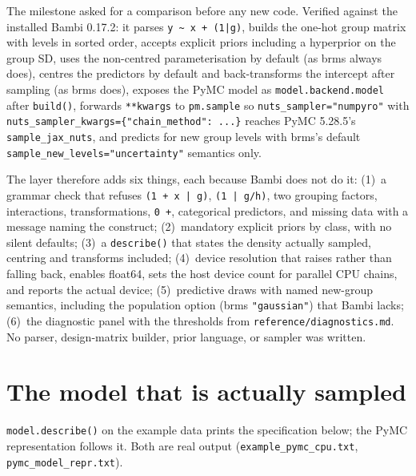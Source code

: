 \documentclass[11pt]{article}
\newcommand{\code}[1]{\texttt{#1}}
\newcommand{\file}[1]{\texttt{#1}}
\begin{document}
The milestone asked for a comparison before any new code. Verified against the installed
Bambi 0.17.2: it parses \code{y \textasciitilde{} x + (1|g)}, builds the one-hot group matrix with levels
in sorted order, accepts explicit priors including a hyperprior on the group SD, uses the
non-centred parameterisation by default (as brms always does), centres the predictors by
default and back-transforms the intercept after sampling (as brms does), exposes the PyMC
model as \code{model.backend.model} after \code{build()}, forwards \code{**kwargs} to
\code{pm.sample} so \code{nuts\_sampler="numpyro"} with \code{nuts\_sampler\_kwargs=\{"chain\_method": ...\}}
reaches PyMC 5.28.5's \code{sample\_jax\_nuts}, and predicts for new group levels with brms's
default \code{sample\_new\_levels="uncertainty"} semantics only.

The layer therefore adds six things, each because Bambi does not do it: (1)~a grammar
check that refuses \code{(1 + x | g)}, \code{(1 | g/h)}, two grouping factors,
interactions, transformations, \code{0 +}, categorical predictors, and missing data with a
message naming the construct; (2)~mandatory explicit priors by class, with no silent
defaults; (3)~a \code{describe()} that states the density actually sampled, centring and
transforms included; (4)~device resolution that raises rather than falling back, enables
float64, sets the host device count for parallel CPU chains, and reports the actual
device; (5)~predictive draws with named new-group semantics, including the population
option (brms \code{"gaussian"}) that Bambi lacks; (6)~the diagnostic panel with the
thresholds from \file{reference/diagnostics.md}. No parser, design-matrix builder, prior
language, or sampler was written.

\section{The model that is actually sampled}

\code{model.describe()} on the example data prints the specification below; the PyMC
representation follows it. Both are real output (\file{example\_pymc\_cpu.txt},
\file{pymc\_model\_repr.txt}).
\end{document}
